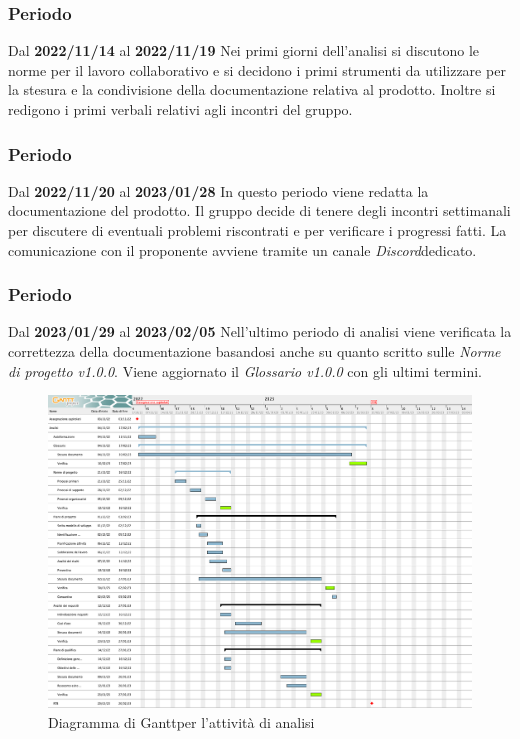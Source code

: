 \subsubsection{ Periodo}
Dal \textbf{2022/11/14} al \textbf{2022/11/19}
\newline
Nei primi giorni dell'analisi si discutono le norme per il lavoro collaborativo e si decidono i primi strumenti da utilizzare per
la stesura e la condivisione della documentazione relativa al prodotto. Inoltre si redigono i primi verbali relativi agli incontri
del gruppo.

\subsubsection{ Periodo}
Dal \textbf{2022/11/20} al \textbf{2023/01/28}
\newline
In questo periodo viene redatta la documentazione del prodotto. Il gruppo decide di tenere degli incontri settimanali per discutere di
eventuali problemi riscontrati e per verificare i progressi fatti. La comunicazione con il proponente avviene tramite un canale
\textit{Discord}\glo\:dedicato.

\subsubsection{ Periodo}
Dal \textbf{2023/01/29} al \textbf{2023/02/05}
\newline
Nell'ultimo periodo di analisi viene verificata la correttezza della documentazione basandosi anche su quanto scritto
sulle \textit{Norme di progetto v1.0.0}. Viene aggiornato il \textit{Glossario v1.0.0} con gli ultimi termini.

\begin{figure}[H]
    \centering
    \includegraphics[scale=0.3]{src/img/Gantt analisi.png}
    \caption{Diagramma di Gantt\glo\:per l'attività di analisi}
\end{figure}

